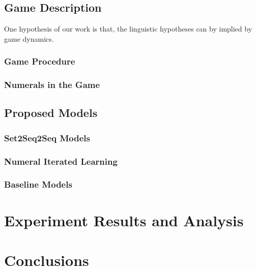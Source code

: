 \documentclass[msc,deptreport]{infthesis} %
\begin{document}
\section{Game Description}
\label{sec3.1:game_description}

One hypothesis of our work is that, the linguistic hypotheses can by implied by game dynamics.

\subsection{Game Procedure}
\label{ssec3.1.1:game_procedure}

\subsection{Numerals in the Game}
\label{ssec3.1.2:numeral_in_game}

\section{Proposed Models}
\label{sec3.2:models}

\subsection{Set2Seq2Seq Models}
\label{ssec3.2.1:set2seq2seq}

\subsection{Numeral Iterated Learning}
\label{ssec3.2.2:3phase}

\subsection{Baseline Models}
\label{ssec3.2.3:baselines}


\chapter{Experiment Results and Analysis}
\label{ch4:results_analysis}


\chapter{Conclusions}
\label{ch5:conclusion}
\end{document}
